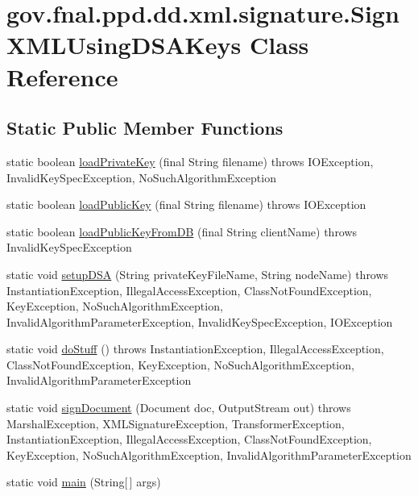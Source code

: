\hypertarget{classgov_1_1fnal_1_1ppd_1_1dd_1_1xml_1_1signature_1_1SignXMLUsingDSAKeys}{\section{gov.\-fnal.\-ppd.\-dd.\-xml.\-signature.\-Sign\-X\-M\-L\-Using\-D\-S\-A\-Keys Class Reference}
\label{classgov_1_1fnal_1_1ppd_1_1dd_1_1xml_1_1signature_1_1SignXMLUsingDSAKeys}
}
\subsection*{Static Public Member Functions}
\begin{DoxyCompactItemize}
\item 
static boolean \hyperlink{classgov_1_1fnal_1_1ppd_1_1dd_1_1xml_1_1signature_1_1SignXMLUsingDSAKeys_adf116a793a94389c6e5117b275e6e831}{load\-Private\-Key} (final String filename)  throws I\-O\-Exception, Invalid\-Key\-Spec\-Exception, No\-Such\-Algorithm\-Exception 
\item 
static boolean \hyperlink{classgov_1_1fnal_1_1ppd_1_1dd_1_1xml_1_1signature_1_1SignXMLUsingDSAKeys_af66415b0a2f20bf6149b9d0cb8c64e33}{load\-Public\-Key} (final String filename)  throws I\-O\-Exception 
\item 
static boolean \hyperlink{classgov_1_1fnal_1_1ppd_1_1dd_1_1xml_1_1signature_1_1SignXMLUsingDSAKeys_a309817e89eb4349b00220e86dd5576ec}{load\-Public\-Key\-From\-D\-B} (final String client\-Name)  throws Invalid\-Key\-Spec\-Exception 
\item 
static void \hyperlink{classgov_1_1fnal_1_1ppd_1_1dd_1_1xml_1_1signature_1_1SignXMLUsingDSAKeys_abb9261a032fa3b30e53b00cc00951a1f}{setup\-D\-S\-A} (String private\-Key\-File\-Name, String node\-Name)  throws Instantiation\-Exception, Illegal\-Access\-Exception, Class\-Not\-Found\-Exception, Key\-Exception, No\-Such\-Algorithm\-Exception, 			\-Invalid\-Algorithm\-Parameter\-Exception, Invalid\-Key\-Spec\-Exception, I\-O\-Exception 
\item 
static void \hyperlink{classgov_1_1fnal_1_1ppd_1_1dd_1_1xml_1_1signature_1_1SignXMLUsingDSAKeys_ad5903686ba075a760d9966c74eae5577}{do\-Stuff} ()  throws Instantiation\-Exception, Illegal\-Access\-Exception, Class\-Not\-Found\-Exception, Key\-Exception, 			\-No\-Such\-Algorithm\-Exception, Invalid\-Algorithm\-Parameter\-Exception 
\item 
static void \hyperlink{classgov_1_1fnal_1_1ppd_1_1dd_1_1xml_1_1signature_1_1SignXMLUsingDSAKeys_a69c317767c62c0502026667b6366f1e1}{sign\-Document} (Document doc, Output\-Stream out)  throws Marshal\-Exception, X\-M\-L\-Signature\-Exception, Transformer\-Exception, Instantiation\-Exception, Illegal\-Access\-Exception, 			\-Class\-Not\-Found\-Exception, Key\-Exception, No\-Such\-Algorithm\-Exception, Invalid\-Algorithm\-Parameter\-Exception 
\item 
static void \hyperlink{classgov_1_1fnal_1_1ppd_1_1dd_1_1xml_1_1signature_1_1SignXMLUsingDSAKeys_a2d236c020bc49fdb4733a457151ca2cd}{main} (String\mbox{[}$\,$\mbox{]} args)
\end{DoxyCompactItemize}


